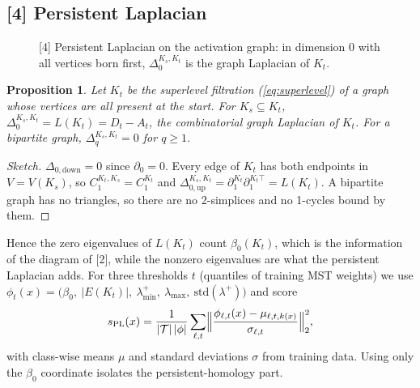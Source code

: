 \documentclass[11pt]{article}
\newtheorem{proposition}{Proposition}
\begin{document}
\subsection{[4] Persistent Laplacian}
\begin{figure}[h]
\centering
{}
\caption{[4] Persistent Laplacian on the activation graph: in dimension 0 with all vertices born
first, $\Delta_0^{K_s,K_t}$ is the graph Laplacian of $K_t$.}
\label{fig:pl}
\end{figure}
\begin{proposition}
\label{prop:pl}
Let $K_t$ be the superlevel filtration (\cref{eq:superlevel}) of a graph whose vertices are all
present at the start. For $K_s\subseteq K_t$, $\Delta_0^{K_s,K_t} = L(K_t) = D_t - A_t$, the
combinatorial graph Laplacian of $K_t$. For a bipartite graph, $\Delta_q^{K_s,K_t}=0$ for $q\ge1$.
\end{proposition}
\begin{proof}[Sketch]
$\Delta_{0,\mathrm{down}}=0$ since $\partial_0=0$. Every edge of $K_t$ has both endpoints in
$V=V(K_s)$, so $C_1^{K_t,K_s}=C_1^{K_t}$ and $\Delta_{0,\mathrm{up}}^{K_s,K_t}=\partial_1^{K_t}\partial_1^{K_t\top}=L(K_t)$.
A bipartite graph has no triangles, so there are no 2-simplices and no 1-cycles bound by them.
\end{proof}
Hence the zero eigenvalues of $L(K_t)$ count $\beta_0(K_t)$, which is the information of the
diagram of [2], while the nonzero eigenvalues are what the persistent Laplacian adds. For three
thresholds $t$ (quantiles of training MST weights) we use
$\phi_t(x)=\bigl(\beta_0,\ |E(K_t)|,\ \lambda_{\min}^{+},\ \lambda_{\max},\ \mathrm{std}(\lambda^{+})\bigr)$
and score
\begin{equation}
  s_{\mathrm{PL}}(x) = \frac{1}{|\mathcal{T}|\,|\phi|}\sum_{\ell,t}\Bigl\|\frac{\phi_{\ell,t}(x)-\mu_{\ell,t,k(x)}}{\sigma_{\ell,t}}\Bigr\|_2^2 ,
  \label{eq:pl-score}
\end{equation}
with class-wise means $\mu$ and standard deviations $\sigma$ from training data. Using only the
$\beta_0$ coordinate isolates the persistent-homology part.
\end{document}
